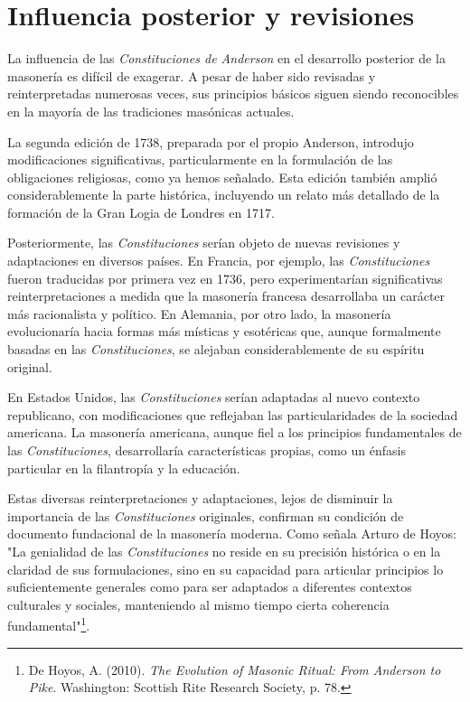 \documentclass[a4paper,12pt,twoside]{book}
\begin{document}
\section{Influencia posterior y revisiones}

La influencia de las \textit{Constituciones de Anderson} en el desarrollo posterior de la masonería es difícil de exagerar. A pesar de haber sido revisadas y reinterpretadas numerosas veces, sus principios básicos siguen siendo reconocibles en la mayoría de las tradiciones masónicas actuales.

La segunda edición de 1738, preparada por el propio Anderson, introdujo modificaciones significativas, particularmente en la formulación de las obligaciones religiosas, como ya hemos señalado. Esta edición también amplió considerablemente la parte histórica, incluyendo un relato más detallado de la formación de la Gran Logia de Londres en 1717.

Posteriormente, las \textit{Constituciones} serían objeto de nuevas revisiones y adaptaciones en diversos países. En Francia, por ejemplo, las \textit{Constituciones} fueron traducidas por primera vez en 1736, pero experimentarían significativas reinterpretaciones a medida que la masonería francesa desarrollaba un carácter más racionalista y político. En Alemania, por otro lado, la masonería evolucionaría hacia formas más místicas y esotéricas que, aunque formalmente basadas en las \textit{Constituciones}, se alejaban considerablemente de su espíritu original.

En Estados Unidos, las \textit{Constituciones} serían adaptadas al nuevo contexto republicano, con modificaciones que reflejaban las particularidades de la sociedad americana. La masonería americana, aunque fiel a los principios fundamentales de las \textit{Constituciones}, desarrollaría características propias, como un énfasis particular en la filantropía y la educación.

Estas diversas reinterpretaciones y adaptaciones, lejos de disminuir la importancia de las \textit{Constituciones} originales, confirman su condición de documento fundacional de la masonería moderna. Como señala Arturo de Hoyos: "La genialidad de las \textit{Constituciones} no reside en su precisión histórica o en la claridad de sus formulaciones, sino en su capacidad para articular principios lo suficientemente generales como para ser adaptados a diferentes contextos culturales y sociales, manteniendo al mismo tiempo cierta coherencia fundamental"\footnote{De Hoyos, A. (2010). \textit{The Evolution of Masonic Ritual: From Anderson to Pike}. Washington: Scottish Rite Research Society, p. 78.}.
\end{document}
